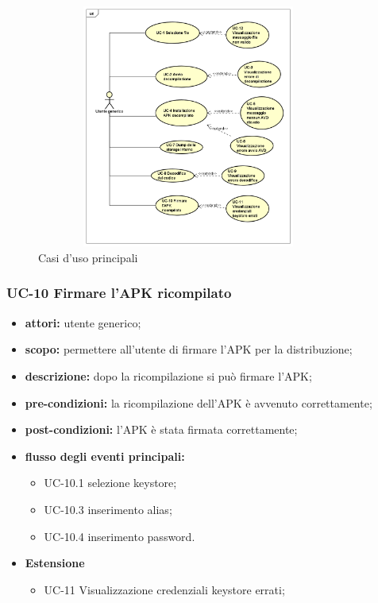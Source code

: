 \begin{figure}[!h]
    \centering
    \includegraphics[width=10cm, height=8cm]{./immagini/usecase/uc_principali.png}
    \caption{Casi d'uso principali}
\end{figure}

\subsubsection{UC-10 Firmare l'APK ricompilato}\label{subsubsec:uc-10-firmare-l'apk-ricompilato}
\begin{itemize}
    \item \textbf{attori:} utente generico;
    \item \textbf{scopo:} permettere all'utente di firmare l'APK per la distribuzione;
    \item \textbf{descrizione:} dopo la ricompilazione si può firmare l'APK;
    \item \textbf{pre-condizioni:} la ricompilazione dell'APK è avvenuto correttamente;
    \item \textbf{post-condizioni:} l'APK è stata firmata correttamente;
    \item \textbf{flusso degli eventi principali:}
    \begin{itemize}
        \item UC-10.1 selezione keystore;
        \item UC-10.3 inserimento alias;
        \item UC-10.4 inserimento password.
    \end{itemize}
    \item \textbf{Estensione}
    \begin{itemize}
        \item UC-11 Visualizzazione credenziali keystore errati;
    \end{itemize}
\end{itemize}
